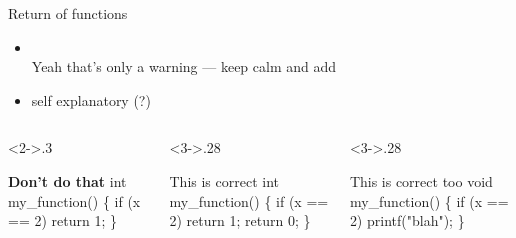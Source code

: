 \begin{frame}[fragile]{Return of functions}
  \begin{itemize}
  \item {}\\
    Yeah that's only a warning --- keep calm and add 
    

    \bigskip
  \item<2->  self
    explanatory (?)
  \end{itemize}

  \begin{columns}
    \begin{column}<2->{.3\linewidth}
      \begin{boitecode}{\alert{\bf Don't do that}}
int my_function() \{
   if (x == 2)
      return 1;
\}

      \end{boitecode}
    \end{column}
    \begin{column}<3->{.28\linewidth}
      \begin{boitecode}{This is correct}
int my_function() \{
   if (x == 2)
      return 1;
   \alert<3>{return 0;}
\}
      \end{boitecode}
    \end{column}
    \begin{column}<3->{.28\linewidth}
      \begin{boitecode}{This is correct too}
\alert<3>{void} my_function() \{
   if (x == 2)
      printf("blah");
\}

      \end{boitecode}
    \end{column}
  \end{columns}

\end{frame}
